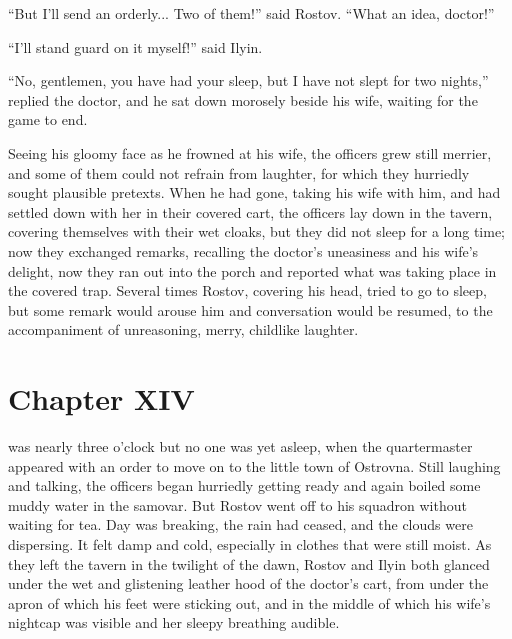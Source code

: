 ``But I'll send an orderly... Two of them!'' said Rostov. ``What
an idea, doctor!''

``I'll stand guard on it myself!'' said Ilyin.

``No, gentlemen, you have had your sleep, but I have not slept
for two nights,'' replied the doctor, and he sat down morosely
beside his wife, waiting for the game to end.

Seeing his gloomy face as he frowned at his wife, the officers
grew still merrier, and some of them could not refrain from
laughter, for which they hurriedly sought plausible
pretexts. When he had gone, taking his wife with him, and had
settled down with her in their covered cart, the officers lay
down in the tavern, covering themselves with their wet cloaks,
but they did not sleep for a long time; now they exchanged
remarks, recalling the doctor's uneasiness and his wife's
delight, now they ran out into the porch and reported what was
taking place in the covered trap. Several times Rostov, covering
his head, tried to go to sleep, but some remark would arouse him
and conversation would be resumed, to the accompaniment of
unreasoning, merry, childlike laughter.


\chapter*{Chapter XIV}
\ifaudio     
{} 
\fi

 was nearly three o'clock but no one was yet asleep, when the
quartermaster appeared with an order to move on to the little
town of Ostrovna. Still laughing and talking, the officers began
hurriedly getting ready and again boiled some muddy water in the
samovar. But Rostov went off to his squadron without waiting for
tea. Day was breaking, the rain had ceased, and the clouds were
dispersing. It felt damp and cold, especially in clothes that
were still moist. As they left the tavern in the twilight of the
dawn, Rostov and Ilyin both glanced under the wet and glistening
leather hood of the doctor's cart, from under the apron of which
his feet were sticking out, and in the middle of which his wife's
nightcap was visible and her sleepy breathing audible.

